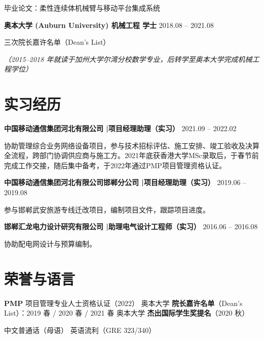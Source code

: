 \documentclass[11pt,a4paper]{article}
\newcommand{\cvdate}[1]{\hfill\textcolor{midgray}{\small #1}}
\begin{document}
{\small 毕业论文：柔性连续体机械臂与移动平台集成系统}

\vspace{0.18em}
{\bfseries 奥本大学 (Auburn University) \quad 机械工程 \quad 学士} \cvdate{2018.08 -- 2021.08}

{\small 三次院长嘉许名单（Dean's List）}

{\small \textit{（2015--2018 年就读于加州大学尔湾分校数学专业，后转学至奥本大学完成机械工程学位）}}

\section{实习经历}

{\bfseries 中国移动通信集团河北有限公司 \quad|\quad 项目经理助理（实习）} \cvdate{2021.09 -- 2022.02}

{\small 协助管理综合业务网络设备项目，参与技术招标评估、施工安排、竣工验收及决算全流程，跨部门协调供应商与施工方。2021年底获香港大学MSc录取后，于春节前完成工作交接，随后集中备考，于2022年通过PMP项目管理资格认证。}

\vspace{0.12em}
{\bfseries 中国移动通信集团河北有限公司邯郸分公司 \quad|\quad 项目经理助理（实习）} \cvdate{2019.06 -- 2019.08}

{\small 参与邯郸武安旅游专线迁改项目，编制项目文件，跟踪项目进度。}

\vspace{0.12em}
{\bfseries 邯郸汇龙电力设计研究有限公司 \quad|\quad 助理电气设计工程师（实习）} \cvdate{2016.06 -- 2016.08}

{\small 协助配电网设计与预算编制。}

\section{荣誉与语言}

{\small
\textbf{PMP} 项目管理专业人士资格认证（2022）
\quad\textbar\quad
奥本大学 \textbf{院长嘉许名单}（Dean's List）：2019 春 / 2020 春 / 2021 春
\quad\textbar\quad
奥本大学 \textbf{杰出国际学生奖提名}（2020 秋）

\vspace{0.25em}
中文普通话（母语） \quad\textbar\quad 英语流利（GRE 323/340）
}
\end{document}
